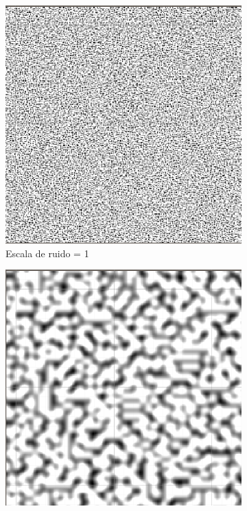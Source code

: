 \begin{figure}[ht]
    \begin{subfigure}{0.3\linewidth}
        \centering
        \includegraphics[width=\linewidth]{img/codes/LowNoiseScale.png}
        \caption{Escala de ruido = 1 }
    \end{subfigure}
    \hfill
    \begin{subfigure}{0.3\linewidth}
        \centering
        \includegraphics[width=\linewidth]{img/codes/MediumNoiseScale.png}

\end{subfigure}
\end{figure}
